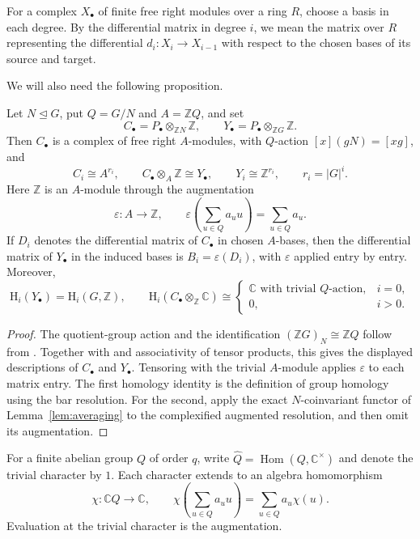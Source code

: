 \documentclass[11pt,a4paper]{amsart}
\numberwithin{equation}{section}
\DeclareMathOperator{\Hom}{Hom}
\newcommand{\HH}{\mathrm H}
\newcommand{\Z}{\mathbb Z}
\begin{document}
For a complex $X_\bullet$ of finite free right modules over
a ring $R$, choose a basis in each degree. By the
differential matrix in degree $i$, we mean the matrix
over $R$ representing the differential
$d_i \colon X_i \to X_{i-1}$ with respect to the chosen
bases of its source and target.

We will also need the following proposition.

\begin{proposition}\label{prop:normal-coinvariants}
Let $N\trianglelefteq G$, put $Q=G/N$ and $A=\Z Q$, and set
\[
 C_\bullet=P_\bullet\otimes_{\Z N}\Z,
 \qquad Y_\bullet=P_\bullet\otimes_{\Z G}\Z.
\]
Then $C_\bullet$ is a complex of free right $A$-modules, with
$Q$-action $[x](gN)=[xg]$, and
\[
 C_i\cong A^{r_i},\qquad
 C_\bullet\otimes_A\Z\cong Y_\bullet,\qquad
 Y_i\cong\Z^{r_i},\qquad r_i=|G|^i.
\]
Here $\Z$ is an $A$-module through the augmentation
\[
 \varepsilon:A\to\Z,\qquad
 \varepsilon\!\left(\sum_{u\in Q}a_u u\right)=\sum_{u\in Q}a_u.
\]
If $D_i$ denotes the differential matrix of $C_\bullet$ in
chosen $A$-bases, then the differential matrix of $Y_\bullet$
in the induced bases is $B_i=\varepsilon(D_i)$, with
$\varepsilon$ applied entry by entry. Moreover,
\[
 \HH_i(Y_\bullet)=\HH_i(G,\Z),\qquad
 \HH_i(C_\bullet\otimes_\Z\mathbb C)\cong
 \begin{cases}
 \mathbb C\text{ with trivial }Q\text{-action},&i=0,\\
 0,&i>0.
 \end{cases}
\]
\end{proposition}

\begin{proof}
The quotient-group action and the identification
$(\Z G)_N\cong\Z Q$ follow from
\cite[Proposition~1.6.4, p.~41]{Lin}. Together with
\cite[Proposition~2.3.8, pp.~144--145]{Lin} and associativity
of tensor products, this gives the displayed descriptions of
$C_\bullet$ and $Y_\bullet$. Tensoring with the trivial
$A$-module applies $\varepsilon$ to each matrix entry.
The first homology identity is the definition of group homology
using the bar resolution. For the second, apply the exact
$N$-coinvariant functor of Lemma~\ref{lem:averaging} to the
complexified augmented resolution, and then omit its augmentation.
\end{proof}

\begin{definition}\label{def:characters}
For a finite abelian group $Q$ of order $q$, write
$\widehat Q=\Hom(Q,\mathbb C^\times)$ and denote the trivial
character by $1$. Each character extends to an algebra homomorphism
\[
 \chi:\mathbb C Q \to\mathbb C,\qquad
 \chi\!\left(\sum_{u\in Q}a_u u\right)=\sum_{u\in Q}a_u\chi(u).
\]
Evaluation at the trivial character is the augmentation.
\end{definition}
\end{document}
